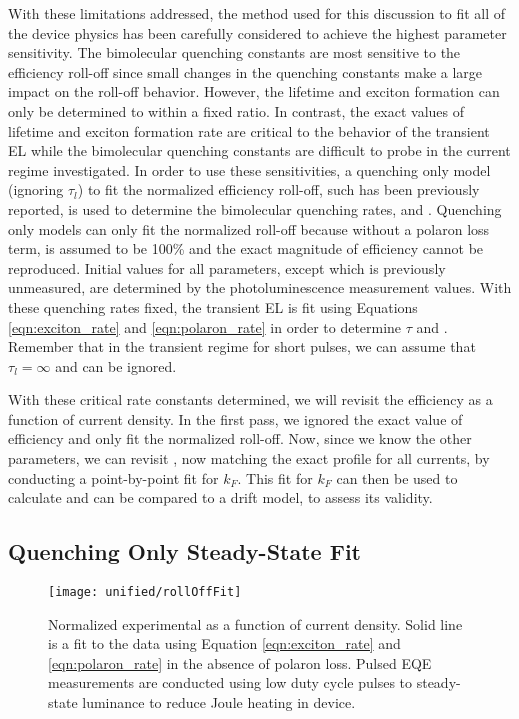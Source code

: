 \documentclass[../thesis.tex]{subfiles}
\begin{document}
With these limitations addressed, the method used for this discussion to fit all of the device physics has been carefully considered to achieve the highest parameter sensitivity.
The bimolecular quenching constants are most sensitive to the efficiency roll-off since small changes in the quenching constants make a large impact on the roll-off behavior.
However, the lifetime and exciton formation can only be determined to within a fixed ratio.
In contrast, the exact values of lifetime and exciton formation rate are critical to the behavior of the transient EL while the bimolecular quenching constants are difficult to probe in the current regime investigated.
In order to use these sensitivities, a quenching only model (ignoring $\tau_l$) to fit the normalized efficiency roll-off, such has been previously reported, is used to determine the bimolecular quenching rates, \ktt and \ktp.  
Quenching only models can only fit the normalized \eqe roll-off because without a polaron loss term, \ef is assumed to be 100\% and the exact magnitude of efficiency cannot be reproduced.
Initial values for all parameters, except \kf which is previously unmeasured, are determined by the photoluminescence measurement values.
With these quenching rates fixed, the transient EL is fit using Equations \ref{eqn:exciton_rate} and \ref{eqn:polaron_rate} in order to determine $\tau$ and \kf.
Remember that in the transient regime for short pulses, we can assume that $\tau_l=\infty$ and can be ignored.

With these critical rate constants determined, we will revisit the efficiency as a function of current density.
In the first pass, we ignored the exact value of efficiency and only fit the normalized roll-off.
Now, since we know the other parameters, we can revisit \eqe, now matching the exact profile for all currents, by conducting a point-by-point fit for $k_F$.
This fit for $k_F$ can then be used to calculate \ef and can be compared to a drift model, to assess its validity.


\subsection{Quenching Only Steady-State Fit}\label{sec:eqe_fitting}

\begin{wrapfigure}{R}{0.5\textwidth}
\texttt{[image: unified/rollOffFit]}
\caption{Normalized experimental \eqe as a function of current density.  Solid line is a fit to the data using Equation \ref{eqn:exciton_rate} and \ref{eqn:polaron_rate} in the absence of polaron loss.  Pulsed EQE measurements are conducted using low duty cycle pulses to steady-state luminance to reduce Joule heating in device.}
\label{fig:rollOffFit}
\end{wrapfigure}
\end{document}
